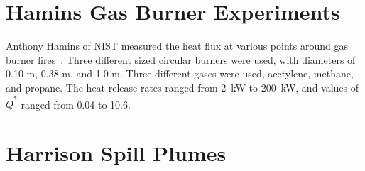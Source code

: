 %
%
%


\section{Hamins Gas Burner Experiments}

Anthony Hamins of NIST measured the heat flux at various points around gas burner fires~\cite{Hostikka:3}. Three different sized circular burners were used, with diameters of 0.10 m, 0.38 m, and 1.0 m. Three different gases were used, acetylene, methane, and propane. The heat release rates ranged from 2~kW to 200~kW, and values of $\dot{Q}^*$ ranged from 0.04 to 10.6.


\section{Harrison Spill Plumes}

